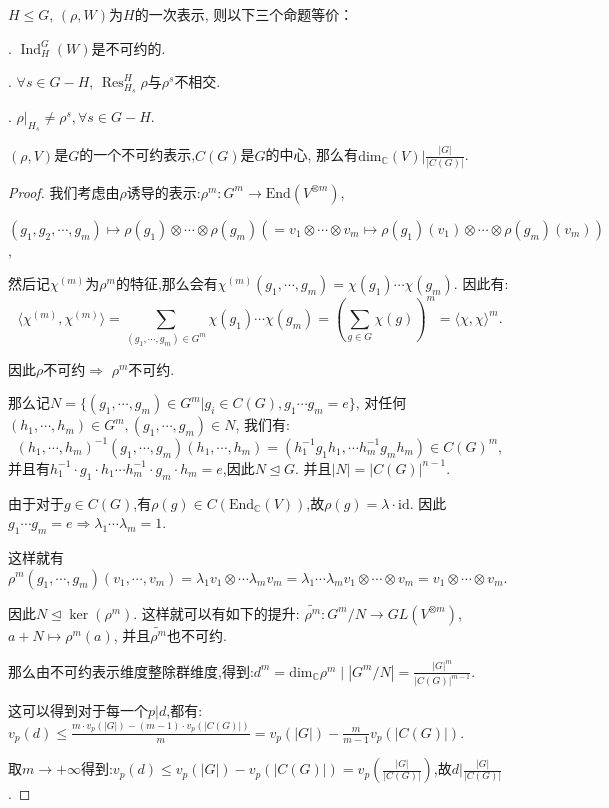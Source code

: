 \begin{corollary}
    $H\leq G$, $(\rho,W)$为$H$的一次表示, 则以下三个命题等价：\par
    . $\operatorname{Ind}_H^G(W)$是不可约的.\par
    . $\forall s\in G-H$, 
    $\operatorname{Res}_{H_s}^H\rho$与$\rho^s$不相交.\par
    . $\rho|_{H_s}\neq \rho^s, \forall s\in G-H$.
\end{corollary}

\begin{theorem}[对不可约表示维度的加强定理]
    $(\rho, V)$是$G$的一个不可约表示,$C(G)$是$G$的中心, 那么有$\mathrm{dim}_{\mathbb{C}} (V) | \frac{|G|}{|C(G)|}$.
\end{theorem}

\begin{proof}
    我们考虑由$\rho$诱导的表示:$\rho^m : G^m \to \mathrm{End}(V^{\otimes m})$, 

    $(g_1, g_2, \cdots, g_m) \mapsto \rho(g_1 ) \otimes \cdots \otimes \rho(g_m)(= v_1 \otimes \cdots \otimes v_m \mapsto \rho(g_1)(v_1) \otimes \cdots \otimes \rho(g_m)(v_m))$,

    然后记$\chi^{(m)}$为$\rho^m$的特征,那么会有$\chi^{(m)}(g_1, \cdots, g_m) = \chi(g_1)\cdots \chi(g_m)$.
    因此有:$$\langle \chi^{(m)}, \chi^{(m)} \rangle = \sum_{(g_1, \cdots, g_m) \in G^m} \chi(g_1) \cdots \chi(g_m) = (\sum_{g\in G} \chi(g))^m = \langle \chi, \chi \rangle^m.$$

    因此$\rho$不可约$\Rightarrow$ $\rho^m$不可约.

    那么记$N = \{(g_1, \cdots, g_m)\in G^m | g_i \in C(G), g_1\cdots g_m = e\}$,
    对任何$(h_1, \cdots, h_m) \in G^m,(g_1, \cdots, g_m)\in N$, 我们有:
    $$(h_1, \cdots, h_m)^{-1}(g_1, \cdots, g_m)(h_1, \cdots, h_m) = (h_1^{-1}g_1h_1 , \cdots h_m^{-1}g_mh_m) \in C(G)^m,$$
    并且有$h_1^{-1}\cdot g_1\cdot h_1  \cdots h_m^{-1}\cdot g_m\cdot h_m = e $,因此$N \trianglelefteq G$.
    并且$|N| = |C(G)|^{n-1}$.

    由于对于$g\in C(G)$,有$\rho(g)\in C(\mathrm{End}_{\mathbb{C}}(V))$,故$\rho(g) = \lambda \cdot \mathrm{id}$.
    因此$g_1 \cdots g_m = e\Rightarrow \lambda_1 \cdots \lambda_m = 1$.

    这样就有$\rho^{m}(g_1, \cdots, g_m) (v_1, \cdots, v_m) = \lambda_1v_1 \otimes \cdots \lambda_mv_m = \lambda_1\cdots \lambda_m v_1 \otimes \cdots \otimes v_m = v_1 \otimes \cdots \otimes v_m$.

    因此$N \trianglelefteq \ker(\rho^m)$.
    这样就可以有如下的提升:
    $\tilde{\rho^m} : G^m/N \to GL(V^{\otimes m})$,
    $a + N \mapsto \rho^m(a)$,
    并且$\tilde{\rho^m}$也不可约.

    那么由不可约表示维度整除群维度,得到:$d^m = \mathrm{dim}_{\mathbb{C}}{\rho^m} \mid |G^m/N| = \frac{|G|^m}{|C(G)|^{m-1}}$.

    这可以得到对于每一个$p | d$,都有:$v_p(d) \leq \frac{m\cdot v_p(|G|)-(m-1)\cdot v_p(|C(G)|)}{m} = v_p(|G|) - \frac{m}{m-1} v_p(|C(G)|)$.
    
    取$m\to +\infty$得到:$v_p(d) \leq v_p(|G|) - v_p(|C(G)|) = v_p(\frac{|G|}{|C(G)|})$,故$d|\frac{|G|}{|C(G)|}$.
    
\end{proof}
